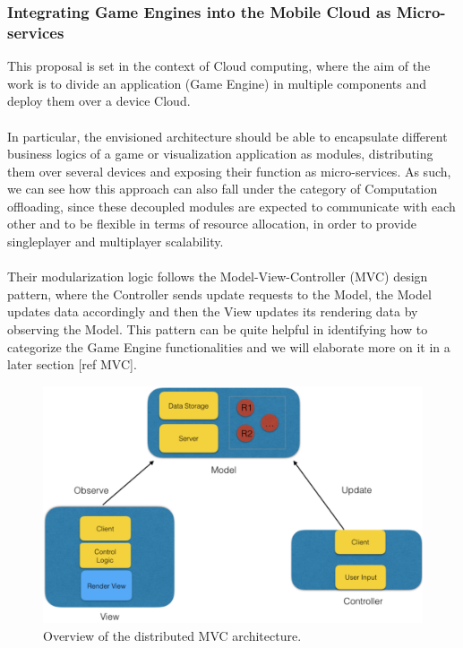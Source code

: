 \subsubsection{Integrating Game Engines into the Mobile Cloud as Micro-services}\label{distribution-MVC}
This proposal is set in the context of Cloud computing, where the aim of the work is to divide an application (Game Engine) in multiple components and deploy them over a device Cloud. \\ \\
In particular, the envisioned architecture should be able to encapsulate different business logics of a game or visualization application as modules, distributing them over several devices and exposing their function as micro-services. As such, we can see how this approach can also fall under the category of Computation offloading, since these decoupled modules are expected to communicate with each other and to be flexible in terms of resource allocation, in order to provide singleplayer and multiplayer scalability. \\ \\
Their modularization logic follows the Model-View-Controller (MVC) design pattern, where the Controller sends update requests to the Model, the Model updates data accordingly and then the View updates its rendering data by observing the Model. This pattern can be quite helpful in identifying how to categorize the Game Engine functionalities and we will elaborate more on it in a later section [ref MVC].
\begin{figure}[h!]
	\centering
	\includegraphics[width=0.9\linewidth]{"immagini/State-of-the-art/MVC distributed architecture"}
	\caption[Overview of the distributed MVC architecture]{Overview of the distributed MVC architecture.}
	\label{fig:mvc-distributed-architecture}
\end{figure}
